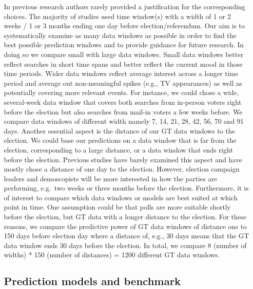\documentclass[
  letterpaper,
  DIV=11,
  numbers=noendperiod]{scrartcl}
\begin{document}
In previous research authors rarely provided a justification for the
corresponding choices. The majority of studies used time window(s) with
a width of 1 or 2 weeks / 1 or 3 months ending one day before
election/referendum. Our aim is to systematically examine as many data
windows as possible in order to find the best possible prediction
windows and to provide guidance for future research. In doing so we
compare small with large data windows. Small data windows better reflect
searches in short time spans and better reflect the current mood in
those time periods. Wider data windows reflect average interest across a
longer time period and average out non-meaningful spikes (e.g., TV
appearances) as well as potentially covering more relevant events. For
instance, we could chose a wide, several-week data window that covers
both searches from in-person voters right before the election but also
searches from mail-in voters a few weeks before. We compare data windows
of different width namely 7, 14, 21, 28, 42, 56, 70 and 91 days. Another
essential aspect is the distance of our GT data windows to the election.
We could base our predictions on a data window that is far from the
election, corresponding to a large distance, or a data window that ends
right before the election. Previous studies have barely examined this
aspect and have mostly chose a distance of one day to the election.
However, election campaign leaders and demoscopists will be more
interested in how the parties are performing, e.g.~two weeks or three
months before the election. Furthermore, it is of interest to compare
which data windows or models are best suited at which point in time. One
assumption could be that polls are more suitable shortly before the
election, but GT data with a longer distance to the election. For these
reasons, we compare the predictive power of GT data windows of distance
one to 150 days before election day where a distance of, e.g., 30 days
means that the GT data window ends 30 days before the election. In
total, we compare 8 (number of widths) * 150 (number of distances) =
1200 different GT data windows.

\hypertarget{sec-models}{%
\subsection{Prediction models and benchmark}\label{sec-models}}
\end{document}
